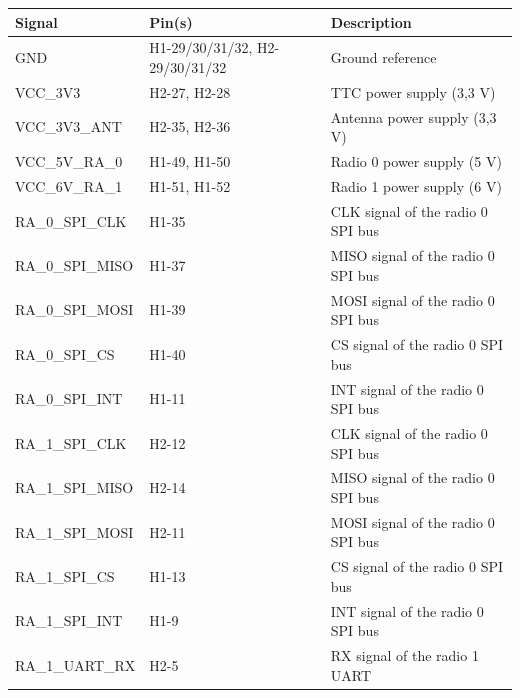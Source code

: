 \begin{table}[!h]
    \centering
    \begin{tabular}{lL{0.3\textwidth}l}
        \toprule[1.5pt]
        \textbf{Signal}  & \textbf{Pin(s)}                  & \textbf{Description} \\
        \midrule
        GND              & H1-29/30/31/32, H2-29/30/31/32   & Ground reference                      \\
        VCC\_3V3         & H2-27, H2-28                     & TTC power supply (3,3 V)              \\
        VCC\_3V3\_ANT    & H2-35, H2-36                     & Antenna power supply (3,3 V)          \\
        VCC\_5V\_RA\_0   & H1-49, H1-50                     & Radio 0 power supply (5 V)            \\
        VCC\_6V\_RA\_1   & H1-51, H1-52                     & Radio 1 power supply (6 V)            \\
        RA\_0\_SPI\_CLK  & H1-35                            & CLK signal of the radio 0 SPI bus     \\
        RA\_0\_SPI\_MISO & H1-37                            & MISO signal of the radio 0 SPI bus    \\
        RA\_0\_SPI\_MOSI & H1-39                            & MOSI signal of the radio 0 SPI bus    \\
        RA\_0\_SPI\_CS   & H1-40                            & CS signal of the radio 0 SPI bus      \\
        RA\_0\_SPI\_INT  & H1-11                            & INT signal of the radio 0 SPI bus     \\
        RA\_1\_SPI\_CLK  & H2-12                            & CLK signal of the radio 0 SPI bus     \\
        RA\_1\_SPI\_MISO & H2-14                            & MISO signal of the radio 0 SPI bus    \\
        RA\_1\_SPI\_MOSI & H2-11                            & MOSI signal of the radio 0 SPI bus    \\
        RA\_1\_SPI\_CS   & H1-13                            & CS signal of the radio 0 SPI bus      \\
        RA\_1\_SPI\_INT  & H1-9                             & INT signal of the radio 0 SPI bus     \\
        RA\_1\_UART\_RX  & H2-5                             & RX signal of the radio 1 UART         \\

\end{tabular}
\end{table}
